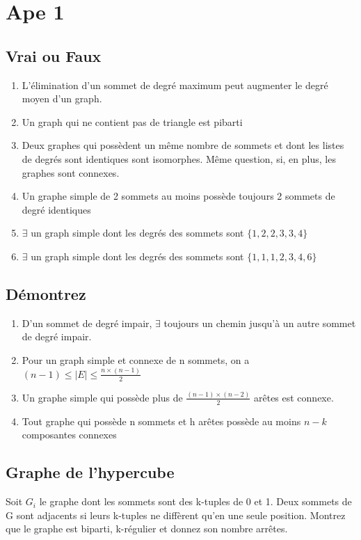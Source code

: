 \section{Ape 1}

\subsection{Vrai ou Faux}
\begin{enumerate}
	\item{L'élimination d'un sommet de degré maximum peut augmenter le degré moyen d'un graph.}
	\item{Un graph qui ne contient pas de triangle est pibarti}
	\item{Deux graphes qui possèdent un même nombre de sommets et dont les listes de degrés sont identiques sont isomorphes. Même question, si, en plus, les graphes sont connexes.}
	\item{Un graphe simple de 2 sommets au moins possède toujours 2 sommets de degré identiques}
	\item{$\exists$ un graph simple dont les degrés des sommets sont $\{1,2,2,3,3,4\}$}
	\item{$\exists$ un graph simple dont les degrés des sommets sont $\{1,1,1,2,3,4,6\}$}	
\end{enumerate}

\subsection{Démontrez}
\begin{enumerate}
\item{D'un sommet de degré impair, $\exists$ toujours un chemin jusqu'à un autre sommet de degré impair.}
\item{Pour un graph simple et connexe de n sommets, on a $(n-1) \leq |E| \leq \frac{n \times (n-1)}{2}$}
\item{Un graphe simple qui possède plus de $\frac{(n-1) \times (n-2)}{2}$ arêtes est connexe.}
\item{Tout graphe qui possède n sommets et h arêtes possède au moins $n-k$ composantes connexes}
\end{enumerate}

\subsection{Graphe de l'hypercube}
Soit $G_{i}$ le graphe dont les sommets sont des k-tuples de 0 et 1. Deux sommets de G sont adjacents si leurs k-tuples ne diffèrent qu'en une seule position. Montrez que le graphe est biparti, k-régulier et donnez son nombre arrêtes.

